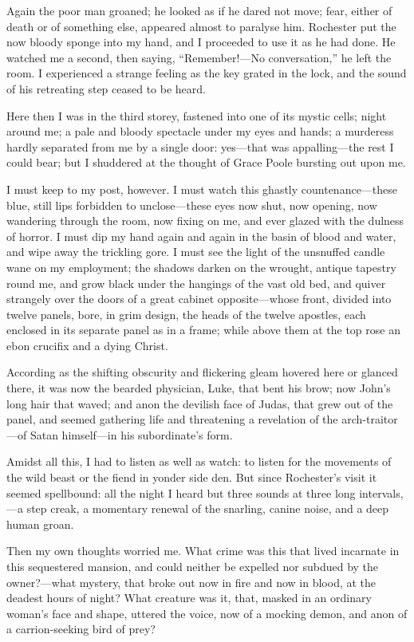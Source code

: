 Again the poor man groaned; he looked as if he dared not move; fear,
either of death or of something else, appeared almost to paralyse him. 
\Mr{} Rochester put the now bloody sponge into my hand, and I proceeded to
use it as he had done. He watched me a second, then saying,
\enquote{Remember!---No conversation,} he left the room. I experienced
a strange feeling as the key grated in the lock, and the sound of his
retreating step ceased to be heard.

Here then I was in the third storey, fastened into one of its mystic
cells; night around me; a pale and bloody spectacle under my eyes and
hands; a murderess hardly separated from me by a single door: yes---that
was appalling---the rest I could bear; but I shuddered at the thought of
Grace Poole bursting out upon me.

I must keep to my post, however. I must watch this ghastly
countenance---these blue, still lips forbidden to unclose---these eyes
now shut, now opening, now wandering through the room, now fixing on me,
and ever glazed with the dulness of horror. I must dip my hand again
and again in the basin of blood and water, and wipe away the trickling
gore. I must see the light of the unsnuffed candle wane on my
employment; the shadows darken on the wrought, antique tapestry round
me, and grow black under the hangings of the vast old bed, and quiver
strangely over the doors of a great cabinet opposite---whose front,
divided into twelve panels, bore, in grim design, the heads of the
twelve apostles, each enclosed in its separate panel as in a frame;
while above them at the top rose an ebon crucifix and a dying Christ.

According as the shifting obscurity and flickering gleam hovered here or
glanced there, it was now the bearded physician, Luke, that bent his
brow; now \St{} John's long hair that waved; and anon the devilish face of
Judas, that grew out of the panel, and seemed gathering life and
threatening a revelation of the arch-traitor---of Satan himself---in his
subordinate's form.

Amidst all this, I had to listen as well as watch: to listen for the
movements of the wild beast or the fiend in yonder side den. But since
\Mr{} Rochester's visit it seemed spellbound: all the night I heard but
three sounds at three long intervals,---a step creak, a momentary
renewal of the snarling, canine noise, and a deep human groan.

Then my own thoughts worried me. What crime was this that lived
incarnate in this sequestered mansion, and could neither be expelled nor
subdued by the owner?---what mystery, that broke out now in fire and now
in blood, at the deadest hours of night? What creature was it, that,
masked in an ordinary woman's face and shape, uttered the voice, now of
a mocking demon, and anon of a carrion-seeking bird of prey?

